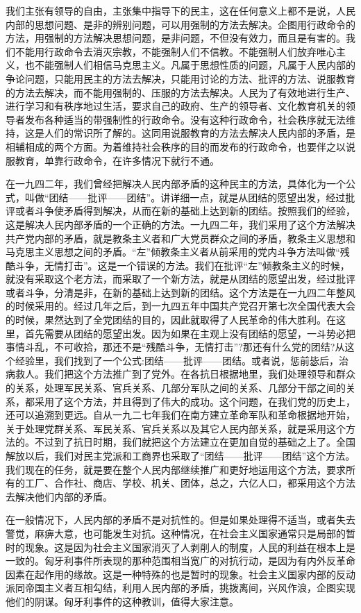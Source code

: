 \documentclass[UTF8, 12pt, a4paper]{ctexrep}
\begin{document}
我们主张有领导的自由，主张集中指导下的民主，这在任何意义上都不是说，人民内部的思想问题、是非的辨别问题，可以用强制的方法去解决。企图用行政命令的方法，用强制的方法解决思想问题，是非问题，不但没有效力，而且是有害的。我们不能用行政命令去消灭宗教，不能强制人们不信教。不能强制人们放弃唯心主义，也不能强制人们相信马克思主义。凡属于思想性质的问题，凡属于人民内部的争论问题，只能用民主的方法去解决，只能用讨论的方法、批评的方法、说服教育的方法去解决，而不能用强制的、压服的方法去解决。人民为了有效地进行生产、进行学习和有秩序地过生活，要求自己的政府、生产的领导者、文化教育机关的领导者发布各种适当的带强制性的行政命令。没有这种行政命令，社会秩序就无法维持，这是人们的常识所了解的。这同用说服教育的方法去解决人民内部的矛盾，是相辅相成的两个方面。为着维持社会秩序的目的而发布的行政命令，也要伴之以说服教育，单靠行政命令，在许多情况下就行不通。

在一九四二年，我们曾经把解决人民内部矛盾的这种民主的方法，具体化为一个公式，叫做“团结——批评——团结”。讲详细一点，就是从团结的愿望出发，经过批评或者斗争使矛盾得到解决，从而在新的基础上达到新的团结。按照我们的经验，这是解决人民内部矛盾的一个正确的方法。一九四二年，我们采用了这个方法解决共产党内部的矛盾，就是教条主义者和广大党员群众之间的矛盾，教条主义思想和马克思主义思想之间的矛盾。“左”倾教条主义者从前采用的党内斗争方法叫做“残酷斗争，无情打击”。这是一个错误的方法。我们在批评“左”倾教条主义的时候，就没有采取这个老方法，而采取了一个新方法，就是从团结的愿望出发，经过批评或者斗争，分清是非，在新的基础上达到新的团结。这个方法是在一九四二年整风的时候采用的。经过几年之后，到一九四五年中国共产党召开第七次全国代表大会的时候，果然达到了全党团结的目的，因此就取得了人民革命的伟大胜利。在这里，首先需要从团结的愿望出发。因为如果在主观上没有团结的愿望，一斗势必把事情斗乱，不可收拾，那还不是“残酷斗争，无情打击”?那还有什么党的团结?从这个经验里，我们找到了一个公式:团结——批评——团结。或者说，惩前毖后，治病救人。我们把这个方法推广到了党外。在各抗日根据地里，我们处理领导和群众的关系，处理军民关系、官兵关系、几部分军队之间的关系、几部分干部之间的关系，都采用了这个方法，并且得到了伟大的成功。这个问题，在我们党的历史上，还可以追溯到更远。自从一九二七年我们在南方建立革命军队和革命根据地开始，关于处理党群关系、军民关系、官兵关系以及其它人民内部关系，就是采用这个方法的。不过到了抗日时期，我们就把这个方法建立在更加自觉的基础之上了。全国解放以后，我们对民主党派和工商界也采取了“团结——批评——团结”这个方法。我们现在的任务，就是要在整个人民内部继续推广和更好地运用这个方法，要求所有的工厂、合作社、商店、学校、机关、团体，总之，六亿人口，都采用这个方法去解决他们内部的矛盾。

在一般情况下，人民内部的矛盾不是对抗性的。但是如果处理得不适当，或者失去警觉，麻痹大意，也可能发生对抗。这种情况，在社会主义国家通常只是局部的暂时的现象。这是因为社会主义国家消灭了人剥削人的制度，人民的利益在根本上是一致的。匈牙利事件所表现的那种范围相当宽广的对抗行动，是因为有内外反革命因素在起作用的缘故。这是一种特殊的也是暂时的现象。社会主义国家内部的反动派同帝国主义者互相勾结，利用人民内部的矛盾，挑拨离间，兴风作浪，企图实现他们的阴谋。匈牙利事件的这种教训，值得大家注意。
\end{document}
